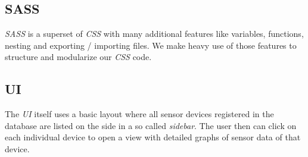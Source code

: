 \subsection{SASS}

\textit{SASS} is a superset of \textit{CSS} with many additional features like
variables, functions, nesting and exporting / importing files. We
make heavy use of those features to structure and modularize our \textit{CSS}
code.

\subsection{UI}

The \textit{UI} itself uses a basic layout where all sensor devices registered in the
database are listed on the side in a so called \textit{sidebar}. The user then can
click on each individual device to open a view  with detailed graphs of sensor
data of that device.